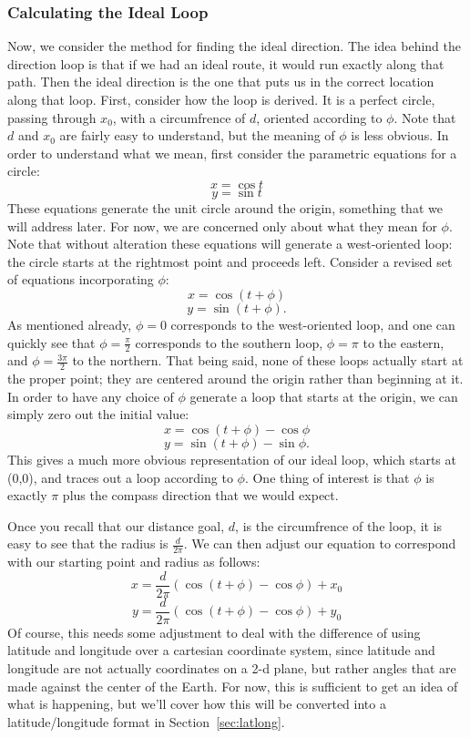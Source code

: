 \documentclass[twocolumn,11pt]{article}
\begin{document}
\subsubsection{Calculating the Ideal Loop}

Now, we consider the method for finding the ideal direction. The idea behind the
direction loop is that if we had an ideal route, it would run exactly along that
path. Then the ideal direction is the one that puts us in the correct location
along that loop. First, consider how the loop is derived. It is a perfect
circle, passing through $x_0$, with a circumfrence of $d$, oriented according to
$\phi$. Note that $d$ and $x_0$ are fairly easy to understand, but the meaning
 of $\phi$ is less obvious. In order to understand what we mean, first consider
the parametric equations for a circle:
\[ x = \cos t \]
\[ y = \sin t \]
These equations generate the unit circle around the origin, something that we
will address later. For now, we are concerned only about what they mean for
$\phi$. Note that without alteration these equations will generate a
west-oriented loop: the circle starts at the rightmost point and proceeds left.
Consider a revised set of equations incorporating $\phi$:
\[ x = \cos (t + \phi) \]
\[ y = \sin (t + \phi). \]
As mentioned already, $\phi = 0$ corresponds to the west-oriented loop, and one
can quickly see that $\phi = \frac{\pi}{2}$ corresponds to the southern loop,
$\phi = \pi$ to the eastern, and $\phi = \frac{3\pi}{2}$ to the northern. That
being said, none of these loops actually start at the proper point; they are
centered around the origin rather than beginning at it. In order to have any
choice of $\phi$ generate a loop that starts at the origin, we can simply zero
out the initial value:
\[ x = \cos (t + \phi) - \cos \phi \]
\[ y = \sin ( t + \phi ) - \sin \phi. \]
This gives a much more obvious representation of our ideal loop, which starts
at (0,0), and traces out a loop according to $\phi$. One thing of interest is
that $\phi$ is exactly $\pi$ plus the compass direction that we would expect.

Once you recall that our distance goal, $d$, is the circumfrence of the loop,
it is easy to see that the radius is $\frac{d}{2\pi}$. We can then adjust our
equation to correspond with our starting point and radius as follows:
\[ x = \frac{d}{2\pi}(\cos ( t + \phi ) - \cos \phi ) + x_0 \]
\[ y = \frac{d}{2\pi}(\cos ( t + \phi ) - \cos \phi ) + y_0 \]
Of course, this needs some adjustment to deal with the difference of using
latitude and longitude over a cartesian coordinate system, since latitude
and longitude are not actually coordinates on a 2-d plane, but rather angles
that are made against the center of the Earth. For now, this is sufficient to
get an idea of what is happening, but we'll cover how this will be converted
into a latitude/longitude format in Section~\ref{sec:latlong}.
\end{document}
